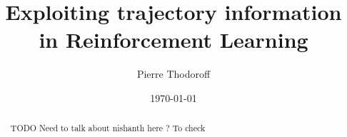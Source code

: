 \documentclass[12pt, oneside, extrafontsizes]{memoir}
\begin{document}

\pretitle{\begin{center}\cftchapterfont\huge}
\posttitle{\end{center}}
\preauthor{\begin{center}\huge}
\postauthor{\end{center}}
\predate{\begin{center}\large}
\postdate{\end{center}}

\title{Exploiting trajectory information in Reinforcement Learning}
\author{Pierre Thodoroff}
\date{\today}
\renewcommand\maketitlehookb{
\vfill
}
\renewcommand\maketitlehookc{
\vfill
\begin{center}
{
\large
Computer Science\\
McGill University, Montreal
}
\end{center}
\vspace{10mm}
}
\renewcommand\maketitlehookd{
\vspace{10mm}
A thesis submitted to McGill University in partial fulfilment of the requirements of
the degree of Master of Science.
\copyright Pierre Thodoroff; \today.
}

\begin{titlingpage}
\maketitle
\end{titlingpage}


\clearpage
{}
\renewcommand{\abstractname}{Acknowledgements}
\begin{abstract}
TODO
Need to talk about nishanth here ? To check
\end{abstract}
\end{document}
